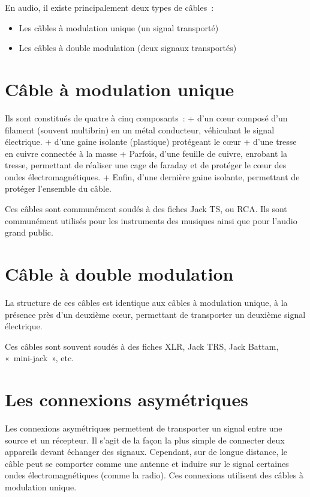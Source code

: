 \documentclass[
]{book}
\providecommand{\tightlist}{%
  \setlength{\itemsep}{0pt}\setlength{\parskip}{0pt}}
\begin{document}
En audio, il existe principalement deux types de câbles~:

\begin{itemize}
\tightlist
\item
  Les câbles à modulation unique (un signal transporté)
\item
  Les câbles à double modulation (deux signaux transportés)
\end{itemize}

\hypertarget{cuxe2ble-uxe0-modulation-unique}{%
\section{Câble à modulation unique}\label{cuxe2ble-uxe0-modulation-unique}}

Ils sont constitués de quatre à cinq composants~:
+ d'un cœur composé d'un filament (souvent multibrin) en un métal conducteur, véhiculant le signal électrique.
+ d'une gaine isolante (plastique) protégeant le cœur
+ d'une tresse en cuivre connectée à la masse
+ Parfois, d'une feuille de cuivre, enrobant la tresse, permettant de réaliser une cage de faraday et de protéger le cœur des ondes électromagnétiques.
+ Enfin, d'une dernière gaine isolante, permettant de protéger l'ensemble du câble.

Ces câbles sont communément soudés à des fiches Jack TS, ou RCA. Ils sont communément utilisés pour les instruments des musiques ainsi que pour l'audio grand public.

\hypertarget{cuxe2ble-uxe0-double-modulation}{%
\section{Câble à double modulation}\label{cuxe2ble-uxe0-double-modulation}}

La structure de ces câbles est identique aux câbles à modulation unique, à la présence près d'un deuxième cœur, permettant de transporter un deuxième signal électrique.

Ces câbles sont souvent soudés à des fiches XLR, Jack TRS, Jack Battam, «~mini-jack~», etc.

\hypertarget{les-connexions-asymuxe9triques}{%
\section{Les connexions asymétriques}\label{les-connexions-asymuxe9triques}}

Les connexions asymétriques permettent de transporter un signal entre une source et un récepteur. Il s'agit de la façon la plus simple de connecter deux appareils devant échanger des signaux. Cependant, sur de longue distance, le câble peut se comporter comme une antenne et induire sur le signal certaines ondes électromagnétiques (comme la radio). Ces connexions utilisent des câbles à modulation unique.
\end{document}
